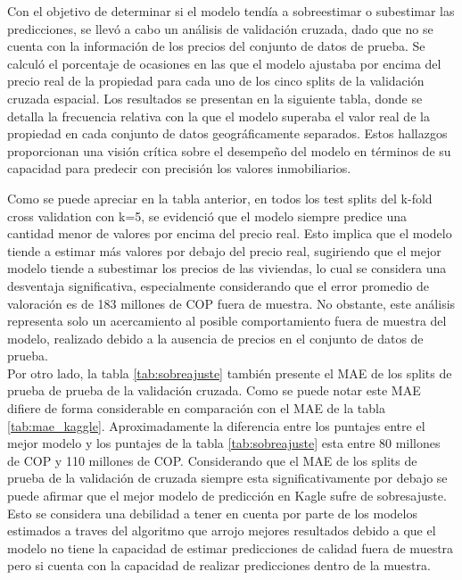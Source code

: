 \documentclass[10pt]{article}
\begin{document}
Con el objetivo de determinar si el modelo tendía a sobreestimar o subestimar las predicciones, se llevó a cabo un análisis de validación cruzada, dado que no se cuenta con la información de los precios del conjunto de datos de prueba. Se calculó el porcentaje de ocasiones en las que el modelo ajustaba por encima del precio real de la propiedad para cada uno de los cinco splits de la validación cruzada espacial. Los resultados se presentan en la siguiente tabla, donde se detalla la frecuencia relativa con la que el modelo superaba el valor real de la propiedad en cada conjunto de datos geográficamente separados. Estos hallazgos proporcionan una visión crítica sobre el desempeño del modelo en términos de su capacidad para predecir con precisión los valores inmobiliarios.



Como se puede apreciar en la tabla anterior, en todos los test splits del k-fold cross validation con k=5, se evidenció que el modelo siempre predice una cantidad menor de valores por encima del precio real. Esto implica que el modelo tiende a estimar más valores por debajo del precio real, sugiriendo que el mejor modelo tiende a subestimar los precios de las viviendas, lo cual se considera una desventaja significativa, especialmente considerando que el error promedio de valoración es de 183 millones de COP fuera de muestra. No obstante, este análisis representa solo un acercamiento al posible comportamiento fuera de muestra del modelo, realizado debido a la ausencia de precios en el conjunto de datos de prueba. \\

Por otro lado, la tabla \ref{tab:sobreajuste} también presente el MAE  de los splits de prueba de prueba de la validación cruzada. Como se puede notar este MAE difiere de forma considerable en comparación con el MAE  de la tabla  \ref{tab:mae_kaggle}. Aproximadamente la diferencia entre los puntajes entre el mejor modelo y los puntajes de la tabla \ref{tab:sobreajuste} esta entre  80 millones de COP y 110 millones de COP. Considerando que el MAE de los splits de prueba de la validación de cruzada siempre esta significativamente por debajo se puede afirmar que el mejor modelo de predicción en Kagle sufre de sobresajuste. Esto se considera una debilidad a tener en cuenta por parte de los modelos estimados a traves del algoritmo que arrojo mejores resultados debido a que el modelo no tiene la capacidad de estimar predicciones de calidad fuera de muestra pero si cuenta con la capacidad de realizar predicciones dentro de la muestra.
\end{document}
